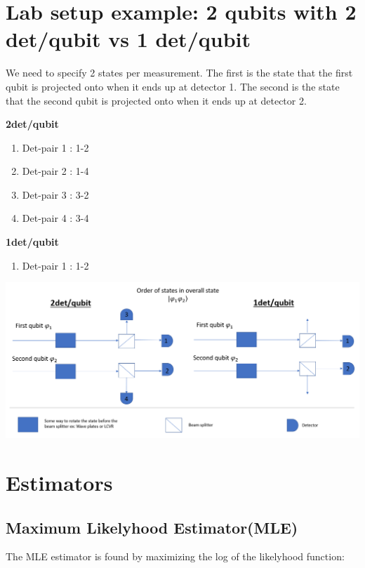 \documentclass{article}
\begin{document}
\section{Lab setup example: 2 qubits with 2 det/qubit vs 1 det/qubit}
We need to specify 2 states per measurement. The first is the state that the first qubit is projected onto when it ends up at detector 1. The second is the state that the second qubit is projected onto when it ends up at detector 2.

\begin{multicols}{2}
\textbf{2det/qubit}
\begin{enumerate}
  \item Det-pair 1 : 1-2
  \item Det-pair 2 : 1-4
  \item Det-pair 3 : 3-2
  \item Det-pair 4 : 3-4
\end{enumerate}

\columnbreak

\textbf{1det/qubit}
\begin{enumerate}
  \item Det-pair 1 : 1-2
\end{enumerate}

\end{multicols}


\begin{center}
    \includegraphics[scale=.6]{DetectorPairs}
\end{center}



\section{Estimators}

\subsection{Maximum Likelyhood Estimator(MLE)}
The MLE estimator is found by maximizing the log of the likelyhood function:
\end{document}
